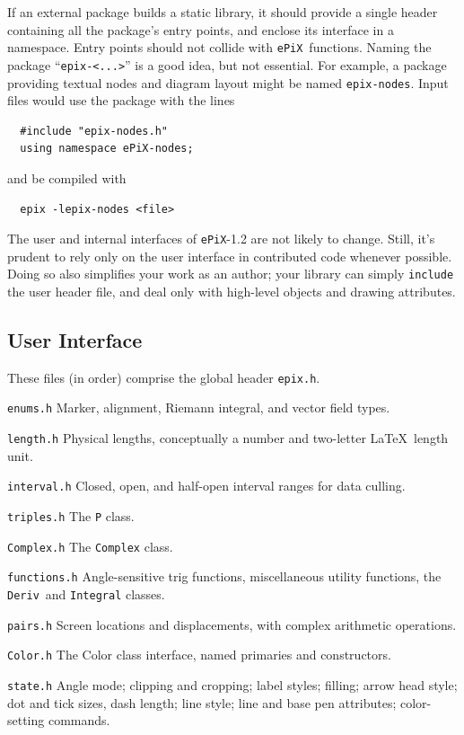 \documentclass[12pt,letterpaper]{book}
\newcommand{\code}[1]{\texttt{#1}}
\newcommand{\filename}[1]{\texttt{#1}}
\newcommand{\ePiX}{\code{ePiX}}
\newcommand{\Header}[1]{\smallskip\noindent\texttt{#1}\quad}%
\begin{document}
If an external package builds a static library, it should provide a
single header containing all the package's entry points, and enclose
its interface in a namespace. Entry points should not collide with
\ePiX\ functions. Naming the package ``\filename{epix-<...>}'' is a
good idea, but not essential. For example, a package providing textual
nodes and diagram layout might be named \filename{epix-nodes}.  Input
files would use the package with the lines
\begin{verbatim}
  #include "epix-nodes.h"
  using namespace ePiX-nodes;
\end{verbatim}
and be compiled with
\begin{verbatim}
  epix -lepix-nodes <file>
\end{verbatim}

The user and internal interfaces of \ePiX-1.2 are not likely to
change. Still, it's prudent to rely only on the user interface in
contributed code whenever possible. Doing so also simplifies your work
as an author; your library can simply \code{include} the user header
file, and deal only with high-level objects and drawing attributes.


\subsection{User Interface}
\label{section-interface}

These files (in order) comprise the global header \filename{epix.h}.

\Header{enums.h} Marker, alignment, Riemann integral, and vector field
types.

\Header{length.h} Physical lengths, conceptually a number and
two-letter \LaTeX\ length unit.

\Header{interval.h} Closed, open, and half-open interval ranges for
data culling.

\Header{triples.h} The \code{P} class.

\Header{Complex.h} The \code{Complex} class.

\Header{functions.h} Angle-sensitive trig functions, miscellaneous
utility functions, the \code{Deriv}~and \code{Integral} classes.

\Header{pairs.h} Screen locations and displacements, with complex
arithmetic operations.

\Header{Color.h} The Color class interface, named
primaries and constructors.

\Header{state.h} Angle mode; clipping and cropping; label styles;
filling; arrow head style; dot and tick sizes, dash length; line
style; line and base pen attributes; color-setting commands.
\end{document}
